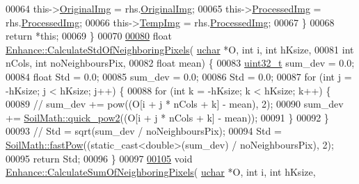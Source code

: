 \begin{DoxyCode}
00064     this->\hyperlink{class_vision_1_1_image_processing_a77c370dab270158a4e9c634e2d3f48e7}{OriginalImg} = rhs.\hyperlink{class_vision_1_1_image_processing_a77c370dab270158a4e9c634e2d3f48e7}{OriginalImg};
00065     this->\hyperlink{class_vision_1_1_image_processing_aa7d65742882cd1b2a1e4e9cb68809211}{ProcessedImg} = rhs.\hyperlink{class_vision_1_1_image_processing_aa7d65742882cd1b2a1e4e9cb68809211}{ProcessedImg};
00066     this->\hyperlink{class_vision_1_1_image_processing_a5371ad8d6f7aac9d43ee5c902ade7435}{TempImg} = rhs.\hyperlink{class_vision_1_1_image_processing_aa7d65742882cd1b2a1e4e9cb68809211}{ProcessedImg};
00067   \}
00068   \textcolor{keywordflow}{return} *\textcolor{keyword}{this};
00069 \}
00070 
\hypertarget{_enhance_8cpp_source_l00080}{}\hyperlink{class_vision_1_1_enhance_ac03740bd6b3cd2936a579644c9646ce0}{00080} \textcolor{keywordtype}{float} \hyperlink{class_vision_1_1_enhance_ac03740bd6b3cd2936a579644c9646ce0}{Enhance::CalculateStdOfNeighboringPixels}(
      \hyperlink{_soil_math_types_8h_a65f85814a8290f9797005d3b28e7e5fc}{uchar} *O, \textcolor{keywordtype}{int} i, \textcolor{keywordtype}{int} hKsize,
00081                                                \textcolor{keywordtype}{int} nCols, \textcolor{keywordtype}{int} noNeighboursPix,
00082                                                \textcolor{keywordtype}{float} mean) \{
00083   \hyperlink{_soil_math_types_8h_a435d1572bf3f880d55459d9805097f62}{uint32\_t} sum\_dev = 0.0;
00084   \textcolor{keywordtype}{float} Std = 0.0;
00085   sum\_dev = 0.0;
00086   Std = 0.0;
00087   \textcolor{keywordflow}{for} (\textcolor{keywordtype}{int} j = -hKsize; j < hKsize; j++) \{
00088     \textcolor{keywordflow}{for} (\textcolor{keywordtype}{int} k = -hKsize; k < hKsize; k++) \{
00089       \textcolor{comment}{// sum\_dev += pow((O[i + j * nCols + k] - mean), 2);}
00090       sum\_dev += \hyperlink{namespace_soil_math_a69d186af0e164a5f98c42985aabec919}{SoilMath::quick\_pow2}((O[i + j * nCols + k] - mean));
00091     \}
00092   \}
00093   \textcolor{comment}{// Std = sqrt(sum\_dev / noNeighboursPix);}
00094   Std = \hyperlink{namespace_soil_math_ab3886ae2a670a717bbe01f94543922a0}{SoilMath::fastPow}((static\_cast<double>(sum\_dev) / noNeighboursPix), 2);
00095   \textcolor{keywordflow}{return} Std;
00096 \}
00097 
\hypertarget{_enhance_8cpp_source_l00105}{}\hyperlink{class_vision_1_1_enhance_a6ff043acf8f40873141ef3bb0af4994d}{00105} \textcolor{keywordtype}{void} \hyperlink{class_vision_1_1_enhance_a6ff043acf8f40873141ef3bb0af4994d}{Enhance::CalculateSumOfNeighboringPixels}(
      \hyperlink{_soil_math_types_8h_a65f85814a8290f9797005d3b28e7e5fc}{uchar} *O, \textcolor{keywordtype}{int} i, \textcolor{keywordtype}{int} hKsize,

\end{DoxyCode}
